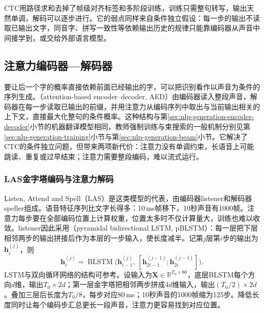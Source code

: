 CTC用路径求和去掉了帧级对齐标签和多阶段训练，训练只需整句转写，输出天然单调，解码可以逐步进行。它的弱点同样来自条件独立假设：每一步的输出不读取已输出文字，同音字、拼写一致性等依赖输出历史的规律只能靠编码器从声音中间接学到，或交给外部语言模型。

\subsection{注意力编码器—解码器}
\label{sec:nlp-speech-aed}

要让后一个字的概率直接依赖前面已经输出的字，可以把识别看作以声音为条件的序列生成。（attention-based encoder--decoder, AED）由编码器读入整段声音，解码器在每一步读取已输出的前缀，并用注意力从编码序列中取出与当前输出相关的上下文，直接最大化整句的条件概率。这种结构与第\ref{sec:nlp-generation-encoder-decoder}小节的机器翻译模型相同，教师强制训练与束搜索的一般机制分别见第\ref{sec:nlp-generation-training}小节与第\ref{sec:nlp-generation-beam}小节。它解决了CTC的条件独立问题，但带来两项新代价：注意力没有单调约束，长语音上可能跳读、重复或过早结束；注意力需要整段编码，难以流式运行。

\subsubsection{LAS金字塔编码与注意力解码}
\label{sec:nlp-speech-las}

Listen, Attend and Spell（LAS）是这类模型的代表，由编码器listener和解码器speller组成。语音特征序列比文字长得多：10\,ms帧移下，10秒声音有1000帧。注意力每步要在全部编码位置上计算权重，位置太多时不仅计算量大，训练也难以收敛。listener因此采用（pyramidal bidirectional LSTM, pBLSTM）：每一层把下层相邻两步的输出拼接后作为本层的一步输入，使长度减半。记第$j$层第$i$步的输出为$\bm{h}^{(j)}_i$，则
\begin{equation}
 \bm{h}^{(j)}_i=\operatorname{BLSTM}\bigl(\bm{h}^{(j)}_{i-1},\,
   [\bm{h}^{(j-1)}_{2i-1};\bm{h}^{(j-1)}_{2i}]\bigr).
 \label{eq:nlp-speech-pblstm}
\end{equation}
LSTM与双向循环网络的结构可参考。设输入为$\bm{X}\in\mathbb{R}^{T_0\times80}$，底层BLSTM每个方向$d$维，输出$T_0\times2d$；第一层金字塔把相邻两步拼成$4d$维输入，输出$(T_0/2)\times2d$。叠加三层后长度为$T_0/8$，每步对应80\,ms；10秒声音的1000帧缩为125步。降低长度同时让每个编码步汇总更长一段声音，注意力更容易找到对应位置。

